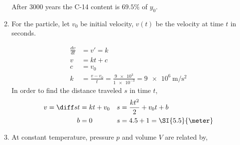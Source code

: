 \begin{enumerate}
          \begin{figure}[H]
              \centering
          \end{figure}
          After 3000 years the C-14 content is $ 69.5 \% $ of $ y_{0} $.

    \item For the particle, let $ v_{0} $ be initial velocity, $ v (t) $ be the
          velocity at time $ t $
          in seconds.

          \begin{align}
              \frac{dv}{dt} & = v' = k                                            \\
              v             & = kt + c                                            \\
              c             & = v_{0}                                             \\
              k             & =\frac{v - v_{0}}{t} = \frac{\num{9e3}}{\num{1e-3}}
              = \SI{9e6}{\meter \per \square \second}
          \end{align}
          In order to find the distance traveled $ s $ in time $ t $,
          \begin{align}
              v = \diff st & = kt + v_{0}                    &
              s            & = \frac{kt^{2}}{2} + v_{0}t + b   \\
              b            & = 0                             &
              s            & = 4.5 + 1 = \SI{5.5}{\meter}
          \end{align}


    \item At constant temperature, pressure $ p $ and volume $ V $ are related by,


\end{enumerate}
